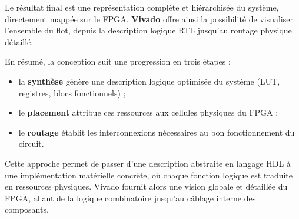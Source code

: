 \medskip

Le résultat final est une représentation complète et hiérarchisée du système, directement mappée sur le FPGA. 
\textbf{Vivado} offre ainsi la possibilité de visualiser l’ensemble du flot, depuis la description logique RTL jusqu’au routage physique détaillé.  

En résumé, la conception suit une progression en trois étapes :  
\begin{itemize}
    \item la \textbf{synthèse} génère une description logique optimisée du système (LUT, registres, blocs fonctionnels) ;  
    \item le \textbf{placement} attribue ces ressources aux cellules physiques du FPGA ;  
    \item le \textbf{routage} établit les interconnexions nécessaires au bon fonctionnement du circuit.  
\end{itemize}

Cette approche permet de passer d’une description abstraite en langage HDL à une implémentation matérielle 
concrète, où chaque fonction logique est traduite en ressources physiques. 
Vivado fournit alors une vision globale et détaillée du FPGA, allant de la logique combinatoire jusqu’au câblage interne des composants.
